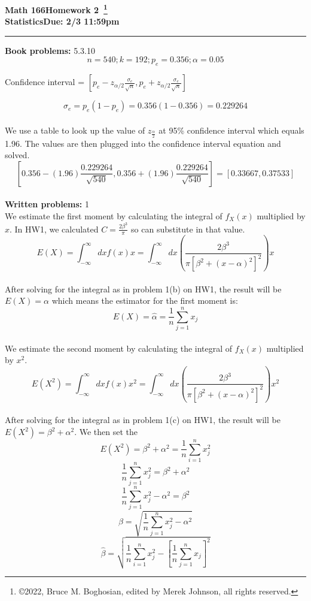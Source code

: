 \documentclass [12pt] {article}
\newcommand{\class}{Math 166}
\newcommand{\classname}{Statistics}
\newcommand{\assignment}{Homework 2}
\newcommand{\duedate}{Due: 2/3 11:59pm}
\begin{document}
\thispagestyle{empty}

\noindent \textbf{\class \hfill \assignment~\footnote{\copyright 2022, Bruce M. Boghosian, edited by Merek Johnson, all rights reserved.}}\\
\textbf{\classname \hfill \duedate} \\
\rule[1ex]{\textwidth}{.1pt}

\noindent \textbf{Book problems:}  5.3.10\\
\[ n = 540; k = 192; p_e = 0.356; \alpha = 0.05 \]

Confidence interval = $[p_e-z_{\alpha/2}\frac{\sigma_e}{\sqrt{n}}, p_e+z_{\alpha/2}\frac{\sigma_e}{\sqrt{n}}]$

\[ \sigma_e = p_e(1-p_e) = 0.356(1-0.356) = 0.229264 \]
\\
We use a table to look up the value of $z_\frac{\alpha}{2}$ at 95\% confidence interval which equals 1.96. The values are then plugged into the confidence interval equation and solved.
\[ [0.356 - (1.96)\frac{0.229264}{\sqrt{540}}, 0.356 + (1.96)\frac{0.229264}{\sqrt{540}}]  = [0.33667, 0.37533]\]
\\
\noindent \textbf{Written problems:} 1\\
We estimate the first moment by calculating the integral of $f_X(x)$ multiplied by $x$. In HW1, we calculated $C=\frac{2\beta^3}{\pi}$ so can substitute in that value.
\[ E(X) = \int_{-\infty}^{\infty} dxf(x)x = \int_{-\infty}^{\infty}dx(\frac{2\beta^3}{\pi[\beta^2+(x-\alpha)^2]^2})x \]
\\
After solving for the integral as in problem 1(b) on HW1, the result will be $E(X) = \alpha$ which means the estimator for the first moment is:
\[ E(X) = \hat{\alpha}= \frac{1}{n}\sum_{j=1}^{n}x_{j} \]
\\
We estimate the second moment by calculating the integral of $f_X(x)$ multiplied by $x^2$.
\[ E(X^2) = \int_{-\infty}^{\infty} dxf(x)x^2 = \int_{-\infty}^{\infty}dx(\frac{2\beta^3}{\pi[\beta^2+(x-\alpha)^2]^2})x^2 \]
\\
After solving for the integral as in problem 1(c) on HW1, the result will be $E(X^2) = \beta^2 + \alpha^2$. We then set the 
\[ E(X^2) = \beta^2 + \alpha^2 = \frac{1}{n}\sum_{i=1}^{n}x_{j}^{2} \]
\[ \frac{1}{n}\sum_{j=1}^{n}x_{j}^{2}= \beta^2 + \alpha^2 \]
\[ \frac{1}{n}\sum_{j=1}^{n}x_{j}^{2} - \alpha^2= \beta^2 \]
\[ \beta = \sqrt{\frac{1}{n}\sum_{j=1}^{n}x_{j}^{2} - \alpha^2} \]
\[ \hat{\beta} = \sqrt{\frac{1}{n}\sum_{i=1}^{n}x_{j}^{2} - [\frac{1}{n}\sum_{j=1}^{n}x_{j}]^2} \]
\end{document}
